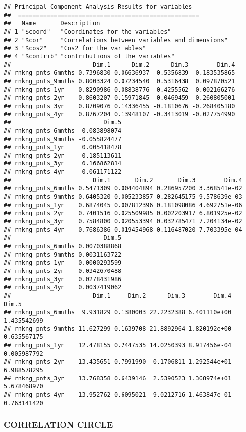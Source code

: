 \documentclass[]{article}
\begin{document}
\begin{verbatim}
## Principal Component Analysis Results for variables
##  ===================================================
##   Name       Description                                    
## 1 "$coord"   "Coordinates for the variables"                
## 2 "$cor"     "Correlations between variables and dimensions"
## 3 "$cos2"    "Cos2 for the variables"                       
## 4 "$contrib" "contributions of the variables"
##                       Dim.1      Dim.2      Dim.3        Dim.4
## rnkng_pnts_6mnths 0.7396830 0.06636937  0.5356839  0.183535865
## rnkng_pnts_9mnths 0.8003324 0.07234540  0.5316438  0.097870521
## rnkng_pnts_1yr    0.8290986 0.08838776  0.4255562 -0.002166276
## rnkng_pnts_2yr    0.8603207 0.15971845 -0.0469459 -0.260805001
## rnkng_pnts_3yr    0.8709076 0.14336455 -0.1810676 -0.268405180
## rnkng_pnts_4yr    0.8767204 0.13948107 -0.3413019 -0.027754990
##                          Dim.5
## rnkng_pnts_6mnths -0.083898074
## rnkng_pnts_9mnths -0.055824477
## rnkng_pnts_1yr     0.005418478
## rnkng_pnts_2yr     0.185113611
## rnkng_pnts_3yr     0.166862814
## rnkng_pnts_4yr     0.061171122
##                       Dim.1       Dim.2       Dim.3        Dim.4
## rnkng_pnts_6mnths 0.5471309 0.004404894 0.286957200 3.368541e-02
## rnkng_pnts_9mnths 0.6405320 0.005233857 0.282645175 9.578639e-03
## rnkng_pnts_1yr    0.6874045 0.007812396 0.181098086 4.692751e-06
## rnkng_pnts_2yr    0.7401516 0.025509985 0.002203917 6.801925e-02
## rnkng_pnts_3yr    0.7584800 0.020553394 0.032785471 7.204134e-02
## rnkng_pnts_4yr    0.7686386 0.019454968 0.116487020 7.703395e-04
##                          Dim.5
## rnkng_pnts_6mnths 0.0070388868
## rnkng_pnts_9mnths 0.0031163722
## rnkng_pnts_1yr    0.0000293599
## rnkng_pnts_2yr    0.0342670488
## rnkng_pnts_3yr    0.0278431986
## rnkng_pnts_4yr    0.0037419062
##                       Dim.1     Dim.2      Dim.3        Dim.4       Dim.5
## rnkng_pnts_6mnths  9.931829 0.1380003 22.2232388 6.401110e+00 1.435542699
## rnkng_pnts_9mnths 11.627299 0.1639708 21.8892964 1.820192e+00 0.635567175
## rnkng_pnts_1yr    12.478155 0.2447535 14.0250393 8.917456e-04 0.005987792
## rnkng_pnts_2yr    13.435651 0.7991990  0.1706811 1.292544e+01 6.988578295
## rnkng_pnts_3yr    13.768358 0.6439146  2.5390523 1.368974e+01 5.678468970
## rnkng_pnts_4yr    13.952762 0.6095021  9.0212716 1.463847e-01 0.763141420
\end{verbatim}

\subsubsection{CORRELATION CIRCLE}\label{correlation-circle}
\end{document}
